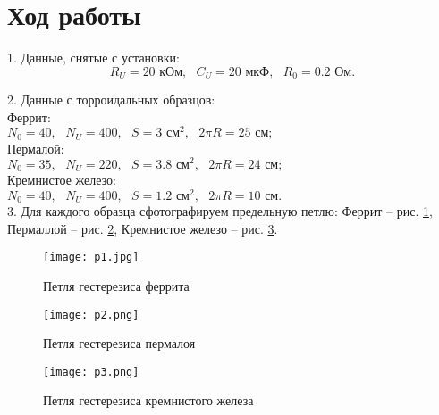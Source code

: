 \section{Ход работы}

1. Данные, снятые с установки:
\[R_U = 20 \text{ кОм}, \text{    } C_U = 20 \text{ мкФ}, \text{    } R_0 = 0.2 \text{ Ом}.\]

2. Данные с торроидальных образцов:\\
Феррит: \\
$N_0 = 40, \text{     } N_U = 400, \text{     } S = 3 \text{ см}^2, \text{     } 2\pi R  = 25 \text{ см};$\\
Пермалой: \\
$N_0 = 35, \text{     } N_U = 220, \text{     } S = 3.8 \text{ см}^2, \text{     } 2\pi R  = 24 \text{ см};$\\
Кремнистое железо: \\
$N_0 = 40, \text{     } N_U = 400, \text{     } S = 1.2 \text{ см}^2, \text{     } 2\pi R  = 10 \text{ см}.$\\

3. Для каждого образца сфотографируем предельную петлю: Феррит  -- рис. \ref{pic:p1},
Пермаллой -- рис. \ref{pic:p2:1}, Кремнистое железо -- рис. \ref{pic:p2:2}.
\begin{figure}[h]
    \centering
    \texttt{[image: p1.jpg]}
    \caption{Петля гестерезиса феррита}
    \label{pic:p1}
\end{figure}
\begin{figure}[h]
    \centering
    \texttt{[image: p2.png]}
    \caption{Петля гестерезиса пермалоя}
    \label{pic:p2:1}
\end{figure}
\begin{figure}[h]
    \centering
    \texttt{[image: p3.png]}
    \caption{Петля гестерезиса кремнистого железа}
    \label{pic:p2:2}
\end{figure}

